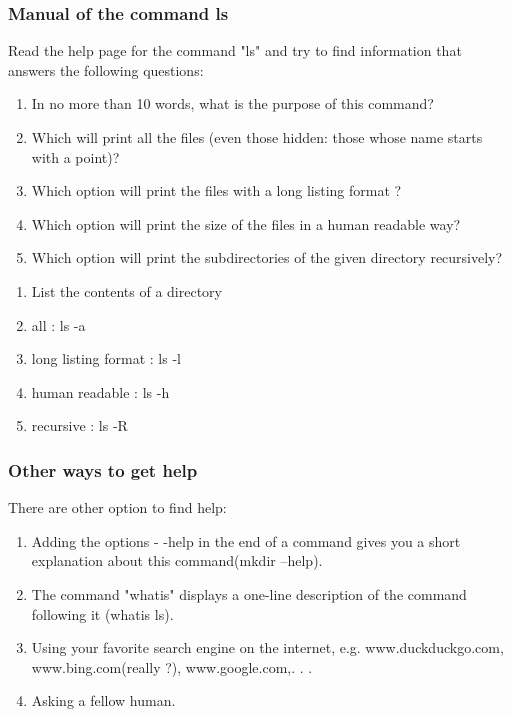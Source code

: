 \documentclass[11pt]{article}
\begin{document}
\subsubsection{Manual of the command \textbf{ls}}

Read the help page for the command "ls" and try to find information that answers the following questions:

\begin{enumerate}
	\item In no more than 10 words, what is the purpose of this command?
	\item Which will print all the files (even those hidden: those whose name starts with a point)?
	\item Which option will print the files with a long listing format ?
	\item Which option will print the size of the files in a human readable way?
	\item Which option will print the subdirectories of the given directory recursively?

\end{enumerate}

\begin{solution}
 \begin{enumerate}
  \item List the contents of a directory
  \item all : ls -a
  \item long listing format : ls -l
  \item human readable : ls -h
  \item recursive : ls -R
 \end{enumerate}
\end{solution}


\subsubsection{Other ways to get help}
There are other option to find help:
\begin{enumerate}
	\item Adding the options - -help in the end of a command gives you a short explanation about this command(mkdir --help).
	\item The command "whatis" displays a one-line description of the command following it (whatis ls).
	\item Using your favorite search engine on the internet, e.g. www.duckduckgo.com, www.bing.com(really ?),
www.google.com,. . .
	\item Asking a fellow human.
\end{enumerate}
\end{document}
